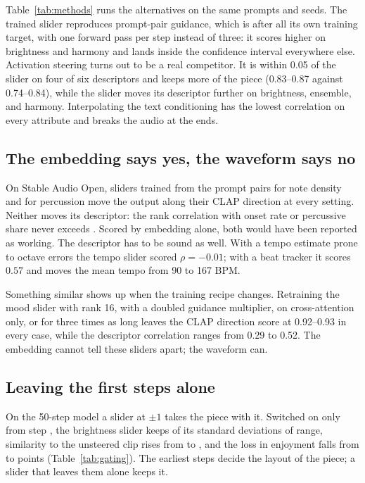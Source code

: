 Table~\ref{tab:methods} runs the alternatives on the same prompts and seeds. The trained slider reproduces prompt-pair guidance, which is after all its own training target, with one forward pass per step instead of three: it scores higher on brightness and harmony and lands inside the confidence interval everywhere else. Activation steering turns out to be a real competitor. It is within 0.05 of the slider on four of six descriptors and keeps more of the piece (0.83--0.87 against 0.74--0.84), while the slider moves its descriptor further on brightness, ensemble, and harmony. Interpolating the text conditioning has the lowest correlation on every attribute and breaks the audio at the ends.



\subsection{The embedding says yes, the waveform says no}

On Stable Audio Open, sliders trained from the prompt pairs for note density and for percussion move the output along their CLAP direction at every setting. Neither moves its descriptor: the rank correlation with onset rate or percussive share never exceeds \weakRho{}. Scored by embedding alone, both would have been reported as working. The descriptor has to be sound as well. With a tempo estimate prone to octave errors the tempo slider scored $\rho=-0.01$; with a beat tracker it scores $0.57$ and moves the mean tempo from 90 to 167 BPM.

Something similar shows up when the training recipe changes. Retraining the mood slider with rank 16, with a doubled guidance multiplier, on cross-attention only, or for three times as long leaves the CLAP direction score at 0.92--0.93 in every case, while the descriptor correlation ranges from 0.29 to 0.52. The embedding cannot tell these sliders apart; the waveform can.

\subsection{Leaving the first steps alone}

On the 50-step model a slider at $\pm1$ takes the piece with it. Switched on only from step \gateSteps{}, the brightness slider keeps \gateRangeOn{} of its \gateRangeOff{} standard deviations of range, similarity to the unsteered clip rises from \gateKeepOff{} to \gateKeepOn{}, and the loss in enjoyment falls from \gateLossOff{} to \gateLossOn{} points (Table~\ref{tab:gating}). The earliest steps decide the layout of the piece; a slider that leaves them alone keeps it.

